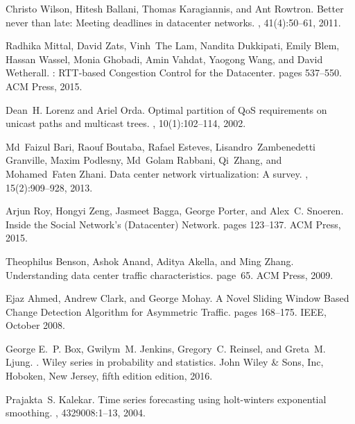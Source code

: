 \begin{thebibliography}{100}
 Christo Wilson, Hitesh Ballani, Thomas Karagiannis, and Ant Rowtron.
\newblock Better never than late: {Meeting} deadlines in datacenter networks.
, 41(4):50--61, 2011.

 Radhika Mittal, David Zats, Vinh~The Lam, Nandita Dukkipati, Emily Blem, Hassan
  Wassel, Monia Ghobadi, Amin Vahdat, Yaogong Wang, and David Wetherall.
: {RTT}-based {Congestion} {Control} for the {Datacenter}.
\newblock pages 537--550. ACM Press, 2015.

 Dean~H. Lorenz and Ariel Orda.
\newblock Optimal partition of {QoS} requirements on unicast paths and
  multicast trees.
, 10(1):102--114, 2002.

 Md~Faizul Bari, Raouf Boutaba, Rafael Esteves, Lisandro~Zambenedetti Granville,
  Maxim Podlesny, Md~Golam Rabbani, Qi~Zhang, and Mohamed~Faten Zhani.
\newblock Data center network virtualization: {A} survey.
, 15(2):909--928, 2013.

 Arjun Roy, Hongyi Zeng, Jasmeet Bagga, George Porter, and Alex~C. Snoeren.
\newblock Inside the {Social} {Network}'s ({Datacenter}) {Network}.
\newblock pages 123--137. ACM Press, 2015.

 Theophilus Benson, Ashok Anand, Aditya Akella, and Ming Zhang.
\newblock Understanding data center traffic characteristics.
\newblock page~65. ACM Press, 2009.

 Ejaz Ahmed, Andrew Clark, and George Mohay.
\newblock A {Novel} {Sliding} {Window} {Based} {Change} {Detection} {Algorithm}
  for {Asymmetric} {Traffic}.
\newblock pages 168--175. IEEE, October 2008.

 George E.~P. Box, Gwilym~M. Jenkins, Gregory~C. Reinsel, and Greta~M. Ljung.
.
\newblock Wiley series in probability and statistics. John Wiley \& Sons, Inc,
  Hoboken, New Jersey, fifth edition edition, 2016.

 Prajakta~S. Kalekar.
\newblock Time series forecasting using holt-winters exponential smoothing.
, 4329008:1--13,
  2004.


\end{thebibliography}
